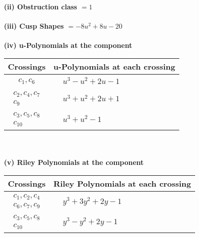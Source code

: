 \documentclass[1p]{elsarticle_modified}
\theoremstyle{definition}
\begin{document}
\flushleft \textbf{(ii) Obstruction class $= 1$}\\~\\
\flushleft \textbf{(iii) Cusp Shapes $= -8 u^2+8 u-20$}\\~\\
\newpage\renewcommand{\arraystretch}{1}
\flushleft \textbf{(iv) u-Polynomials at the component}\newline \\
\begin{tabular}{m{50pt}|m{274pt}}
Crossings & \hspace{64pt}u-Polynomials at each crossing \\
\hline $$\begin{aligned}c_{1},c_{6}\end{aligned}$$&$\begin{aligned}
&u^3- u^2+2 u-1
\end{aligned}$\\
\hline $$\begin{aligned}c_{2},c_{4},c_{7}\\c_{9}\end{aligned}$$&$\begin{aligned}
&u^3+u^2+2 u+1
\end{aligned}$\\
\hline $$\begin{aligned}c_{3},c_{5},c_{8}\\c_{10}\end{aligned}$$&$\begin{aligned}
&u^3+u^2-1
\end{aligned}$\\
\hline
\end{tabular}\\~\\
\newpage\renewcommand{\arraystretch}{1}
\flushleft \textbf{(v) Riley Polynomials at the component}\newline \\
\begin{tabular}{m{50pt}|m{274pt}}
Crossings & \hspace{64pt}Riley Polynomials at each crossing \\
\hline $$\begin{aligned}c_{1},c_{2},c_{4}\\c_{6},c_{7},c_{9}\end{aligned}$$&$\begin{aligned}
&y^3+3 y^2+2 y-1
\end{aligned}$\\
\hline $$\begin{aligned}c_{3},c_{5},c_{8}\\c_{10}\end{aligned}$$&$\begin{aligned}
&y^3- y^2+2 y-1
\end{aligned}$\\
\hline
\end{tabular}\\~\\
\end{document}
